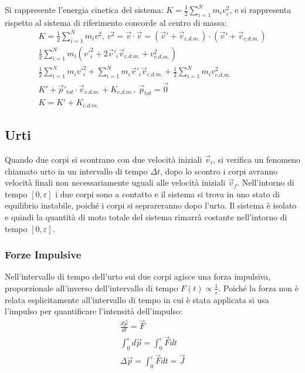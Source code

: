 \documentclass{article}
\numberwithin{equation}{subsection}
\begin{document}
Si rappresente l'energia cinetica del sistema:
$K=\displaystyle\frac{1}{2}\sum_{i=1}^{N}m_iv_i^{2}$, e 
si rappresenta rispetto al sistema di riferimento concorde al 
centro di massa:
\begin{gather}
    K=\displaystyle\frac{1}{2}\sum_{i=1}^{N}m_iv^{2},\:v^{2}=\vec{v}\cdot\vec{v}=(\vec{v}'+\vec{v}_{c.d.m.})\cdot(\vec{v}'+\vec{v}_{c.d.m.})\\
    \displaystyle\frac{1}{2}\sum_{i=1}^{N}m_i(v'^{2}_i+2\vec{v}'_i\vec{v}_{c.d.m.}+v_{c.d.m.}^{2})\\
    \displaystyle\frac{1}{2}\displaystyle\sum_{i=1}^{N}m_iv'^{2}_i+\displaystyle\sum_{i=1}^{N}m_i\vec{v}'_i\vec{v}_{c.d.m.}+\frac{1}{2}\displaystyle\sum_{i=1}^{N}m_iv_{c.d.m.}^{2}\\
    K'+\vec{p}'_{tot}\cdot\vec{v}_{c.d.m.}+K_{c.d.m.},\:\vec{p}_{tot}=\vec{0}\\
    K=K'+K_{c.d.m.}
\end{gather}

\subsection{Urti}
Quando due corpi si scontrano con due velocità iniziali $\vec{v}_i$, 
si verifica un fenomeno 
chiamato urto in un intervallo di tempo $\Delta t$, dopo 
lo scontro i corpi avranno velocità finali non necessariamente 
uguali alle velocità iniziali $\vec{v}_f$. Nell'intorno di tempo 
$[0,\varepsilon]$ i due corpi sono a contatto e il sistema si trova 
in uno stato di equilibrio instabile, poiché i corpi si 
seprareranno dopo l'urto. Il sistema è isolato e quindi la 
quantità di moto totale del sistema rimarrà costante nell'intorno 
di tempo $[0,\varepsilon]$. 

 
\subsubsection{Forze Impulsive}
Nell'intervallo di tempo dell'urto sui due corpi agisce una 
forza impulsiva, proporzionale all'inverso dell'intervallo di tempo 
$F(t)\propto \displaystyle\frac{1}{\varepsilon}$. 
Poiché la forza non è relata esplicitamente all'intervallo di 
tempo in cui è stata applicata si usa l'impulso per quantificare 
l'intensità dell'impulso:
\begin{gather}
    \displaystyle\frac{d\vec{p}}{dt}=\vec{F}\\
    \displaystyle\int_{0}^{\varepsilon}d\vec{p}=\int_{0}^{\varepsilon}\vec{F}dt\\
    \Delta\vec{p}=\displaystyle\int_{0}^{\varepsilon}\vec{F}dt=\vec{J}
\end{gather}
\end{document}

